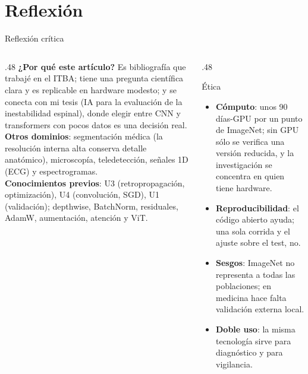 \documentclass[aspectratio=169,xcolor=table]{beamer}
\begin{document}
\section{Reflexión}
\begin{frame}{Reflexión crítica}
  \begin{columns}[T]
    \begin{column}{.48\textwidth}
      \small
      \textbf{¿Por qué este artículo?} Es bibliografía que trabajé en el ITBA; tiene una pregunta científica
      clara y es replicable en hardware modesto; y se conecta con mi tesis (IA para la evaluación de la
      inestabilidad espinal), donde elegir entre CNN y transformers con pocos datos es una decisión real.\\[4pt]
      \textbf{Otros dominios}: segmentación médica (la resolución interna alta conserva detalle anatómico),
      microscopía, teledetección, señales 1D (ECG) y espectrogramas.\\[4pt]
      \textbf{Conocimientos previos}: U3 (retropropagación, optimización), U4 (convolución, SGD), U1 (validación);
      depthwise, BatchNorm, residuales, AdamW, aumentación, atención y ViT.
    \end{column}
    \begin{column}{.48\textwidth}
      \begin{alertblock}{Ética}
        \footnotesize
        \begin{itemize}
          \item \textbf{Cómputo}: unos 90 días-GPU por un punto de ImageNet; sin GPU sólo se verifica una versión
          reducida, y la investigación se concentra en quien tiene hardware.
          \item \textbf{Reproducibilidad}: el código abierto ayuda; una sola corrida y el ajuste sobre el test, no.
          \item \textbf{Sesgos}: ImageNet no representa a todas las poblaciones; en medicina hace falta validación
          externa local.
          \item \textbf{Doble uso}: la misma tecnología sirve para diagnóstico y para vigilancia.
        \end{itemize}
      \end{alertblock}
    \end{column}
  \end{columns}
\end{frame}


\end{document}
